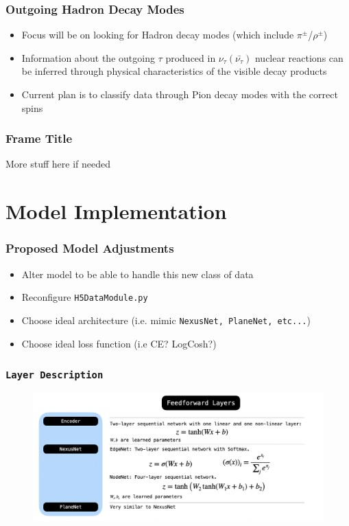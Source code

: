 \documentclass{beamer}
\begin{document}
\begin{frame}
\frametitle{Outgoing Hadron Decay Modes}
	\begin{itemize}
		\item Focus will be on looking for Hadron decay modes (which include $\pi^{\pm}$/$\rho^{\pm}$)
        \item Information about the outgoing $\tau$ produced in $\nu_{\tau}(\bar{\nu_{\tau}})$ nuclear reactions can be inferred through physical characteristics of the visible decay products
		\item Current plan is to classify data through Pion decay modes with the correct spins
	\end{itemize}
\end{frame}


\begin{frame}
    \frametitle{Frame Title}
    More stuff here if needed
\end{frame}


\section{Model Implementation}


\begin{frame}
\frametitle{Proposed Model Adjustments}
	\begin{itemize}
		\item Alter model to be able to handle this new class of data

		\item Reconfigure \texttt{H5DataModule.py}
		\item Choose ideal architecture (i.e. mimic \texttt{NexusNet, PlaneNet, etc...})
		\item Choose ideal loss function (i.e CE? LogCosh?)
	\end{itemize}
\end{frame}


\begin{frame}
	\frametitle{\texttt{Layer Description}}
		\begin{figure}[h!]
			\includegraphics[width=1\textwidth]{images/model3.png}
			\label{model3}
		\end{figure}
\end{frame}
\end{document}
